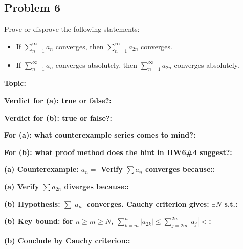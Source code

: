 \documentclass[12pt]{article}
\newcommand{\fillfield}[1]{%
  \par\noindent\textbf{#1:}\enspace\hrulefill\par\vspace{3pt}%
}
\begin{document}
\newpage
\subsection{Problem 6}

\begin{tcolorbox}[
  enhanced, breakable,
  colback  = probblue,
  colframe = blue!55!black,
  fonttitle = \bfseries,
  title = {\textsc{Problem Statement}\hfill Homework 7, Problem 6}
]
Prove or disprove the following statements:
\begin{itemize}[nosep, leftmargin=1.8em]
  \item[(a)] If $\sum_{n=1}^{\infty} a_n$ converges, then $\sum_{n=1}^{\infty} a_{2n}$
    converges.
  \item[(b)] If $\sum_{n=1}^{\infty} a_n$ converges absolutely, then
    $\sum_{n=1}^{\infty} a_{2n}$ converges absolutely.
\end{itemize}
\end{tcolorbox}

\bigskip

\begin{tcolorbox}[
  enhanced, breakable,
  colback  = pass1green,
  colframe = green!55!black,
  fonttitle = \bfseries,
  title = {Pass 1 \enspace\textbf{--}\enspace First Diagnosis}
]
\fillfield{Topic}
\fillfield{Verdict for (a): true or false?}
\fillfield{Verdict for (b): true or false?}
\fillfield{For (a): what counterexample series comes to mind?}
\fillfield{For (b): what proof method does the hint in HW6\#4 suggest?}
\end{tcolorbox}

\bigskip

\begin{tcolorbox}[
  enhanced, breakable,
  colback  = pass2yellow,
  colframe = yellow!65!black,
  fonttitle = \bfseries,
  title = {Pass 2 \enspace\textbf{--}\enspace Proof Recipe Card}
]
\fillfield{(a) Counterexample: $a_n =$\hspace{1cm} Verify $\sum a_n$ converges because:}
\fillfield{(a) Verify $\sum a_{2n}$ diverges because:}
\fillfield{(b) Hypothesis: $\sum |a_n|$ converges. Cauchy criterion gives: $\exists N$ s.t.}
\fillfield{(b) Key bound: for $n \geq m \geq N$, $\sum_{k=m}^n |a_{2k}| \leq \sum_{j=2m}^{2n} |a_j| <$}
\fillfield{(b) Conclude by Cauchy criterion:}
\end{tcolorbox}
\end{document}
